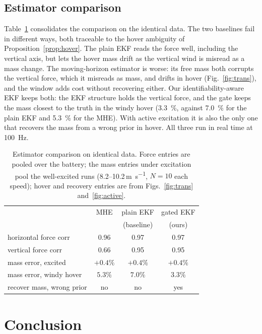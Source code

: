 \documentclass{ieeeaccess}
\begin{document}
\subsection{Estimator comparison}
Table~\ref{tab:compare} consolidates the comparison on the identical data. The
two baselines fail in different ways, both traceable to the hover ambiguity of
Proposition~\ref{prop:hover}. The plain EKF reads the force well, including the
vertical axis, but lets the hover mass drift as the vertical wind is misread as a
mass change. The moving-horizon estimator is worse: its free mass both corrupts
the vertical force, which it misreads as mass, and drifts in hover (Fig.~\ref{fig:trans}),
and the window adds cost without recovering either. Our identifiability-aware EKF
keeps both: the EKF structure holds the vertical force, and the gate keeps the mass
closest to the truth in the windy hover (\SI{3.3}{\percent}, against
\SI{7.0}{\percent} for the plain EKF and \SI{5.3}{\percent} for the MHE). With
active excitation it is also the only one that recovers the mass from a wrong prior
in hover. All three run in real time at \SI{100}{\hertz}.

\begin{table}[t]
\centering
\caption{Estimator comparison on identical data. Force entries are pooled over
the battery; the mass entries under excitation pool the well-excited runs
(8.2--10.2\,\si{\meter\per\second}, $N{=}10$ each speed); hover and recovery
entries are from Figs.~\ref{fig:trans} and~\ref{fig:active}.}
\label{tab:compare}
\begin{tabular}{lccc}
\toprule
 & MHE & plain EKF & gated EKF \\
 &     & (baseline) & (ours) \\
\midrule
horizontal force corr      & 0.96 & 0.97 & 0.97 \\
vertical force corr        & 0.66 & 0.95 & 0.95 \\
mass error, excited        & $+0.4\%$ & $+0.4\%$ & $+0.4\%$ \\
mass error, windy hover    & $5.3\%$ & $7.0\%$ & $\mathbf{3.3\%}$ \\
recover mass, wrong prior  & no & no & yes \\
\bottomrule
\end{tabular}
\end{table}

\section{Conclusion}\label{sec:conclusion}
\end{document}
